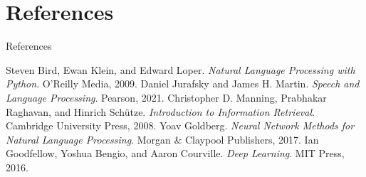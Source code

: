 \documentclass[aspectratio=169, hideothersubsections]{beamer}
\begin{document}

\section*{References}
\begin{frame}{References}
  \begin{thebibliography}{10}
    \beamertemplatebookbibitems
     Steven Bird, Ewan Klein, and Edward Loper. \textit{Natural Language Processing with Python}. O'Reilly Media, 2009.
    \beamertemplatebookbibitems
     Daniel Jurafsky and James H. Martin. \textit{Speech and Language Processing}. Pearson, 2021.
    \beamertemplatebookbibitems
     Christopher D. Manning, Prabhakar Raghavan, and Hinrich Schütze. \textit{Introduction to Information Retrieval}. Cambridge University Press, 2008.
    \beamertemplatebookbibitems
     Yoav Goldberg. \textit{Neural Network Methods for Natural Language Processing}. Morgan \& Claypool Publishers, 2017.
    \beamertemplatebookbibitems
     Ian Goodfellow, Yoshua Bengio, and Aaron Courville. \textit{Deep Learning}. MIT Press, 2016.
  \end{thebibliography}
\end{frame}
\end{document}
